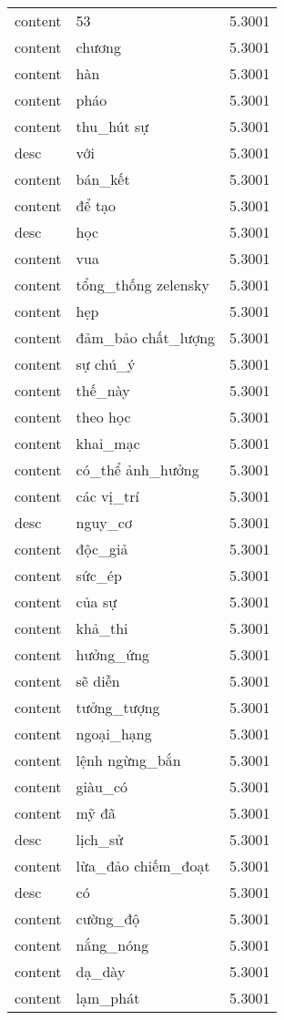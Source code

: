 \documentclass{article}
\begin{document}
\begin{tabular}{lll}
content & 53 & 5.3001\\
content & chương & 5.3001\\
content & hàn & 5.3001\\
content & pháo & 5.3001\\
content & thu\_hút sự & 5.3001\\
desc & với & 5.3001\\
content & bán\_kết & 5.3001\\
content & để tạo & 5.3001\\
desc & học & 5.3001\\
content & vua & 5.3001\\
content & tổng\_thống zelensky & 5.3001\\
content & hẹp & 5.3001\\
content & đảm\_bảo chất\_lượng & 5.3001\\
content & sự chú\_ý & 5.3001\\
content & thế\_này & 5.3001\\
content & theo học & 5.3001\\
content & khai\_mạc & 5.3001\\
content & có\_thể ảnh\_hưởng & 5.3001\\
content & các vị\_trí & 5.3001\\
desc & nguy\_cơ & 5.3001\\
content & độc\_giả & 5.3001\\
content & sức\_ép & 5.3001\\
content & của sự & 5.3001\\
content & khả\_thi & 5.3001\\
content & hưởng\_ứng & 5.3001\\
content & sẽ diễn & 5.3001\\
content & tưởng\_tượng & 5.3001\\
content & ngoại\_hạng & 5.3001\\
content & lệnh ngừng\_bắn & 5.3001\\
content & giàu\_có & 5.3001\\
content & mỹ đã & 5.3001\\
desc & lịch\_sử & 5.3001\\
content & lừa\_đảo chiếm\_đoạt & 5.3001\\
desc & có & 5.3001\\
content & cường\_độ & 5.3001\\
content & nắng\_nóng & 5.3001\\
content & dạ\_dày & 5.3001\\
content & lạm\_phát & 5.3001\\

\end{tabular}
\end{document}
